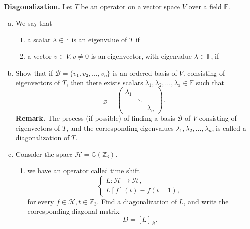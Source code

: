 \documentclass{article}
\def\zz{{\mathbb Z}}
\def\cc{{\mathbb C}}
\begin{document}
\begin{problem} \\ 
    \textbf{Diagonalization.} Let $T$ be an operator on a vector space $V$ over a field $\mathbb{F}$.
    \begin{enumerate}[(a)]
        \item We say that 
        \begin{enumerate}[1.]
            \item a scalar $\lambda \in \mathbb{F}$ is an eigenvalue of $T$ if 
            \item a vector $v \in V, v \neq 0$ is an eigenvector, with eigenvalue $\lambda \in \mathbb{F}$, if
        \end{enumerate}
        \item Show that if $\mathscr{B} = \{ v_1, v_2, \ldots, v_n \}$ is an ordered basis of $V$, consisting of eigenvectors of $T$, then there exists scalars $\lambda_1, \lambda_2, \ldots, \lambda_n \in \mathbb{F}$ such that 
        \begin{equation*}
            [T]_{\mathscr{B}} = \begin{pmatrix}
                \lambda_1 && \\
                & \ddots & \\
                && \lambda_n
            \end{pmatrix}.
        \end{equation*}
        \textbf{Remark.} The process (if possible) of finding a basis $\mathscr{B}$ of $V$ consisting of eigenvectors of $T$, and the corresponding eigenvalues $\lambda_1, \lambda_2, \ldots, \lambda_n$, is called a diagonalization of $T$.
        \item Consider the space $\mathscr{H} = \cc(\zz_3)$.
        \begin{enumerate}[1.]
            \item we have an operator called time shift
            \begin{equation*}
                \begin{cases}
                    L : \mathscr{H} \to \mathscr{H}, \\
                    L[f](t) = f(t-1),
                \end{cases}
            \end{equation*}
            for every $f \in \mathscr{H}, t \in \zz_3$. Find a diagonalization of $L$, and write the corresponding diagonal matrix 
            \begin{equation*}
                D = [L]_{\mathscr{B}}.

\end{equation*}
\end{enumerate}
\end{enumerate}
\end{problem}
\end{document}
